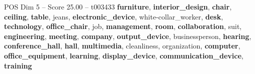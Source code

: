\begin{textsample}{POS Dim 5 – Score 25.00 – t003433}  \label{ex:f5_pos_040}
\textbf{furniture}, \textbf{interior\_design}, \textbf{chair}, \textbf{ceiling}, \textbf{table}, jeans, \textbf{electronic\_device}, white-collar\_worker, \textbf{desk}, \textbf{technology}, \textbf{office\_chair}, job, \textbf{management}, \textbf{room}, \textbf{collaboration}, suit, \textbf{engineering}, \textbf{meeting}, \textbf{company}, \textbf{output\_device}, businessperson, \textbf{hearing}, \textbf{conference\_hall}, \textbf{hall}, \textbf{multimedia}, cleanliness, organization, \textbf{computer}, \textbf{office\_equipment}, \textbf{learning}, \textbf{display\_device}, \textbf{communication\_device}, \textbf{training}

\end{textsample}
